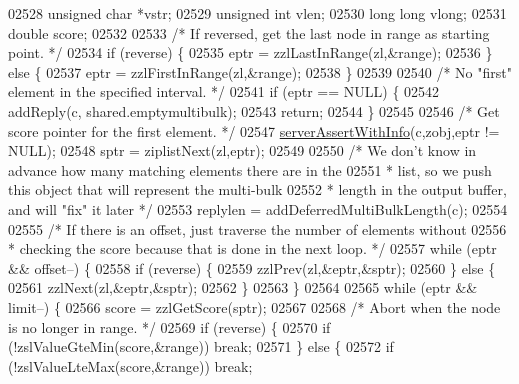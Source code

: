 \begin{DoxyCode}
02528         \textcolor{keywordtype}{unsigned} \textcolor{keywordtype}{char} *vstr;
02529         \textcolor{keywordtype}{unsigned} \textcolor{keywordtype}{int} vlen;
02530         \textcolor{keywordtype}{long} \textcolor{keywordtype}{long} vlong;
02531         \textcolor{keywordtype}{double} score;
02532 
02533         \textcolor{comment}{/* If reversed, get the last node in range as starting point. */}
02534         \textcolor{keywordflow}{if} (reverse) \{
02535             eptr = zzlLastInRange(zl,&range);
02536         \} \textcolor{keywordflow}{else} \{
02537             eptr = zzlFirstInRange(zl,&range);
02538         \}
02539 
02540         \textcolor{comment}{/* No "first" element in the specified interval. */}
02541         \textcolor{keywordflow}{if} (eptr == NULL) \{
02542             addReply(c, shared.emptymultibulk);
02543             \textcolor{keywordflow}{return};
02544         \}
02545 
02546         \textcolor{comment}{/* Get score pointer for the first element. */}
02547         \hyperlink{server_8h_a7308f76cbff9a8d3797fe78190b91282}{serverAssertWithInfo}(c,zobj,eptr != NULL);
02548         sptr = ziplistNext(zl,eptr);
02549 
02550         \textcolor{comment}{/* We don't know in advance how many matching elements there are in the}
02551 \textcolor{comment}{         * list, so we push this object that will represent the multi-bulk}
02552 \textcolor{comment}{         * length in the output buffer, and will "fix" it later */}
02553         replylen = addDeferredMultiBulkLength(c);
02554 
02555         \textcolor{comment}{/* If there is an offset, just traverse the number of elements without}
02556 \textcolor{comment}{         * checking the score because that is done in the next loop. */}
02557         \textcolor{keywordflow}{while} (eptr && offset--) \{
02558             \textcolor{keywordflow}{if} (reverse) \{
02559                 zzlPrev(zl,&eptr,&sptr);
02560             \} \textcolor{keywordflow}{else} \{
02561                 zzlNext(zl,&eptr,&sptr);
02562             \}
02563         \}
02564 
02565         \textcolor{keywordflow}{while} (eptr && limit--) \{
02566             score = zzlGetScore(sptr);
02567 
02568             \textcolor{comment}{/* Abort when the node is no longer in range. */}
02569             \textcolor{keywordflow}{if} (reverse) \{
02570                 \textcolor{keywordflow}{if} (!zslValueGteMin(score,&range)) \textcolor{keywordflow}{break};
02571             \} \textcolor{keywordflow}{else} \{
02572                 \textcolor{keywordflow}{if} (!zslValueLteMax(score,&range)) \textcolor{keywordflow}{break};

\end{DoxyCode}
